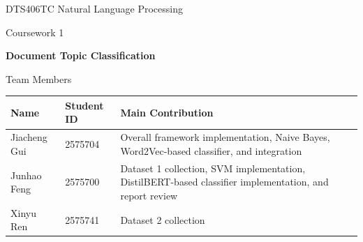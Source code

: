 \begin{titlepage}
\centering
\vspace*{2.2cm}

{\Large DTS406TC Natural Language Processing\par}
\vspace{0.5cm}
{\large Coursework 1\par}
\vspace{1.4cm}
{\huge\bfseries Document Topic Classification\par}
\vspace{2.0cm}

{\Large Team Members\par}
\vspace{0.6cm}
\begin{tabular}{ll>{\raggedright\arraybackslash}p{7.6cm}}
\toprule
Name & Student ID & Main Contribution \\
\midrule
Jiacheng Gui & 2575704 & Overall framework implementation, Naive Bayes, Word2Vec-based classifier, and integration \\
Junhao Feng & 2575700 & Dataset 1 collection, SVM implementation, DistilBERT-based classifier implementation, and report review \\
Xinyu Ren & 2575741 & Dataset 2 collection \\
\bottomrule
\end{tabular}

\vfill
\end{titlepage}

